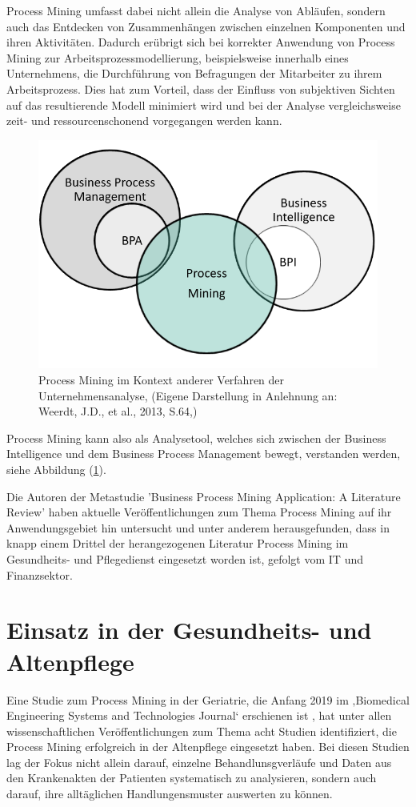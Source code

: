 Process Mining umfasst dabei nicht allein die Analyse von Abläufen, sondern auch das Entdecken von Zusammenhängen zwischen einzelnen Komponenten und ihren Aktivitäten. Dadurch erübrigt sich bei korrekter Anwendung von Process Mining zur Arbeitsprozessmodellierung, beispielsweise innerhalb eines Unternehmens, die Durchführung von Befragungen der Mitarbeiter zu ihrem Arbeitsprozess. Dies hat zum Vorteil, dass der Einfluss von subjektiven Sichten auf das resultierende Modell minimiert wird und bei der Analyse vergleichsweise zeit- und ressourcenschonend vorgegangen werden kann.
\begin{figure}[!ht]
    \centering
    \includegraphics[scale=0.41]{figures/Appbildungen/businessanalytics.PNG}
    \caption{Process Mining im Kontext anderer Verfahren der Unternehmensanalyse,  (Eigene Darstellung in Anlehnung an: Weerdt, J.D., et al., 2013, S.64,\cite{DeWeerdt})}
    \label{fig:BIContext}
\end{figure}

Process Mining kann also als Analysetool, welches sich zwischen der Business Intelligence und dem Business Process Management bewegt, verstanden werden, siehe Abbildung (\ref{fig:BIContext}).

Die Autoren der Metastudie 'Business Process Mining Application: A Literature Review' \cite{litreview} haben aktuelle Veröffentlichungen zum Thema Process Mining auf ihr Anwendungsgebiet hin untersucht und unter anderem herausgefunden, dass in knapp einem Drittel der herangezogenen Literatur Process Mining im Gesundheits- und Pflegedienst eingesetzt worden ist, gefolgt vom IT und Finanzsektor.

\section{Einsatz in der Gesundheits- und Altenpflege}
Eine Studie zum Process Mining in der Geriatrie, die Anfang 2019 im ‚Biomedical Engineering Systems and Technologies Journal‘ erschienen ist \cite{wrro141683}, hat unter allen wissenschaftlichen Veröffentlichungen zum Thema acht Studien identifiziert, die Process Mining erfolgreich in der Altenpflege eingesetzt haben. Bei diesen Studien lag der Fokus nicht allein darauf, einzelne Behandlunsgverläufe und Daten aus den Krankenakten der Patienten systematisch zu analysieren, sondern auch darauf, ihre alltäglichen Handlungensmuster auswerten zu können. 

